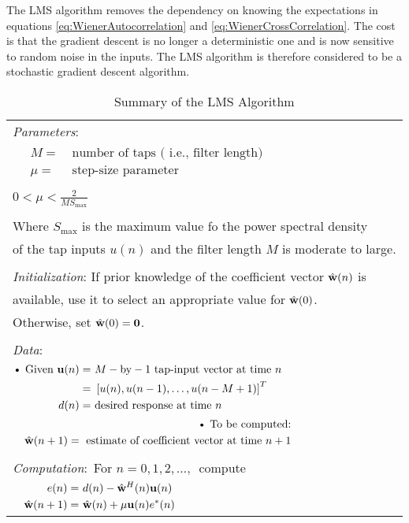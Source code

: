The LMS algorithm removes the dependency on knowing the %
expectations in equations \ref{eq:WienerAutocorrelation} %
and \ref{eq:WienerCrossCorrelation}. The cost is that %
the gradient descent is no longer a deterministic one %
and is now sensitive to random noise in the inputs. The LMS %
algorithm is therefore considered to be a stochastic gradient %
descent algorithm.
\begin{table}[ht]
	\centering
	\begin{tabular}{l}
		\hline
		\emph{Parameters}: \\
		$\begin{aligned}
			\quad M =&~\text{number of taps (
			i.e., filter length)}\\
			\quad \mu =&~\text{step-size 
			parameter}
		\end{aligned}$\\
		\\
		$0 < \mu < \frac{2}{MS_{\text{max}}}$\\
		\\
		Where $S_{\text{max}}$ is the maximum
		value fo the power spectral density\\
		of the tap inputs $u(n)$ and the filter
		length $M$ is moderate to large.\\
		\\
		\emph{Initialization}: If prior
		knowledge of the coefficient vector 
		$\hat{\bold{w}}(n)$ is \\available, use 
		it to select an appropriate value for 
		$\hat{\bold{w}}(0)$. \\Otherwise, set 
		$\hat{\bold{w}}(0) = \bold{0}$.\\
		\\
		\emph{Data}: \\
		$\begin{aligned}
			\text{\textbullet}~
			\text{Given } \bold{u}(n) =&~
			M-\text{by}-1~\text{tap-input 
			vector at time }n\\
			=&~\left[u(n),u(n-1),\ldots,
			u(n-M+1)\right]^{T}\\
			d(n) =&~\text{desired response
			at time }n
		\end{aligned}$\\
		$\begin{aligned}
			\text{\textbullet}~
			\text{To be computed:}\\
			\quad\hat{\bold{w}}(n+1)=~
			\text{estimate of coefficient vector
			at time }n+1
		\end{aligned}$\\
		\\
		\emph{Computation}:~For $n=0,1,2,\ldots,$~compute\\
		$\begin{aligned}
			\quad e(n)=&~d(n) - \hat{\bold{w}}^{H}(n)
			\bold{u}(n)\\
			\quad \hat{\bold{w}}(n+1) =&~ 
			\hat{\bold{w}}(n) + \mu\bold{u}(n)e
			^{*}(n)
		\end{aligned}$\\
		\hline
	\end{tabular}
	\caption{Summary of the LMS Algorithm \cite{Hay02}}
	\label{tab:LMS}
\end{table}
\FloatBarrier
